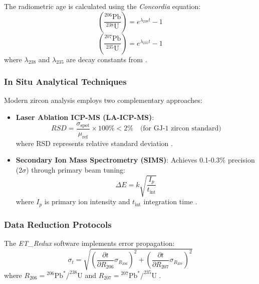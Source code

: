 \documentclass{article}
\begin{document}
The radiometric age is calculated using the \textit{Concordia} equation:
\begin{equation}
    \left(\frac{^{206}\text{Pb}}{^{238}\text{U}}\right) = e^{\lambda_{238}t} - 1
    \label{eq:concordia206}
\end{equation}
\begin{equation}
    \left(\frac{^{207}\text{Pb}}{^{235}\text{U}}\right) = e^{\lambda_{235}t} - 1
    \label{eq:concordia207}
\end{equation}
where \(\lambda_{238}\) and \(\lambda_{235}\) are decay constants from \cite{Jaffey1975}.

\subsubsection*{In Situ Analytical Techniques}
Modern zircon analysis employs two complementary approaches:

\begin{itemize}
    \item \textbf{Laser Ablation ICP-MS (LA-ICP-MS)}:
    \begin{equation}
        RSD = \frac{\sigma_{\text{spot}}}{\mu_{\text{ref}}} \times 100\% < 2\% \quad \text{(for GJ-1 zircon standard)} 
        \label{eq:rsd}
    \end{equation}
    where RSD represents relative standard deviation \cite{Jackson2004}.
    
    \item \textbf{Secondary Ion Mass Spectrometry (SIMS)}:
    Achieves 0.1-0.3\% precision (2\(\sigma\)) through primary beam tuning:
    \begin{equation}
        \Delta E = k\sqrt{\frac{I_p}{t_{\text{int}}}}
        \label{eq:sims_error}
    \end{equation}
    where \(I_p\) is primary ion intensity and \(t_{\text{int}}\) integration time \cite{Schmitt2003}.
\end{itemize}

\subsubsection*{Data Reduction Protocols}
The \textit{ET\_Redux} software implements error propagation:
\begin{equation}
    \sigma_t = \sqrt{\left(\frac{\partial t}{\partial R_{206}}\sigma_{R_{206}}\right)^2 + \left(\frac{\partial t}{\partial R_{207}}\sigma_{R_{207}}\right)^2}
    \label{eq:error_prop}
\end{equation}
where \(R_{206} = {}^{206}\text{Pb}^*/^{238}\text{U}\) and \(R_{207} = {}^{207}\text{Pb}^*/^{235}\text{U}\) \cite{Bowring2018}.
\end{document}
